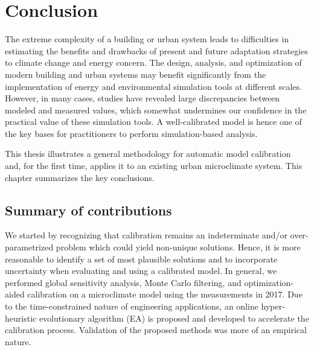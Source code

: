 \chapter{Conclusion}

%

The extreme complexity of a building or urban system leads to difficulties in estimating the benefits and drawbacks of present and future adaptation strategies to climate change and energy concern. The design, analysis, and optimization of modern building and urban systems may benefit significantly from the implementation of energy and environmental simulation tools at different scales. However, in many cases, studies have revealed large discrepancies between modeled and measured values, which somewhat undermines our confidence in the practical value of these simulation tools. A well-calibrated model is hence one of the key bases for practitioners to perform simulation-based analysis.

This thesis illustrates a general methodology for automatic model calibration and, for the first time, applies it to an existing urban microclimate system. This chapter summarizes the key conclusions.

\section{Summary of contributions}

We started by recognizing that calibration remains an indeterminate and/or over-parametrized problem which could yield non-unique solutions. Hence, it is more reasonable to identify a set of most plausible solutions and to incorporate uncertainty when evaluating and using a calibrated model. In general, we performed global sensitivity analysis, Monte Carlo filtering, and optimization-aided calibration on a microclimate model using the measurements in 2017. Due to the time-constrained nature of engineering applications, an online hyper-heuristic evolutionary algorithm (EA) is proposed and developed to accelerate the calibration process.  Validation of the proposed methods was more of an empirical nature.

